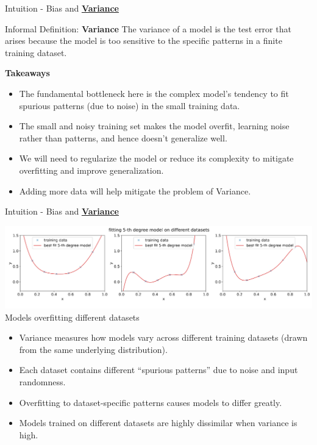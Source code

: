 \documentclass{beamer}
\begin{document}
\begin{frame}{Intuition - Bias and \underline{\textbf{Variance}}}
    \begin{block}{Informal Definition: \textbf{Variance}}
        The variance of a model is the test error that arises because the model is too sensitive to the specific patterns in a finite training dataset.
    \end{block}

    \textbf{Takeaways}
    
    \begin{itemize}
        \item The fundamental bottleneck here is the complex model's tendency to fit spurious patterns (due to noise) in the small training data.
        \item The small and noisy training set makes the model overfit, learning noise rather than patterns, and hence doesn’t generalize well.
        \item We will need to regularize the model or reduce its complexity to mitigate overfitting and improve generalization.
        \item Adding more data will help mitigate the problem of Variance.
    \end{itemize}
\end{frame}

\begin{frame}{Intuition - Bias and \underline{\textbf{Variance}}}
    \begin{center}
        \includegraphics[width=\linewidth]{images/biasvar/5DonDiffData.png} \\
        \scriptsize{Models overfitting different datasets}
    \end{center}

    \vspace{0.3cm}

    \begin{itemize}
        \item Variance measures how models vary across different training datasets (drawn from the same underlying distribution).
        \item Each dataset contains different “spurious patterns” due to noise and input randomness.
        \item Overfitting to dataset-specific patterns causes models to differ greatly.
        \item Models trained on different datasets are highly dissimilar when variance is high.
    \end{itemize}
\end{frame}
\end{document}
